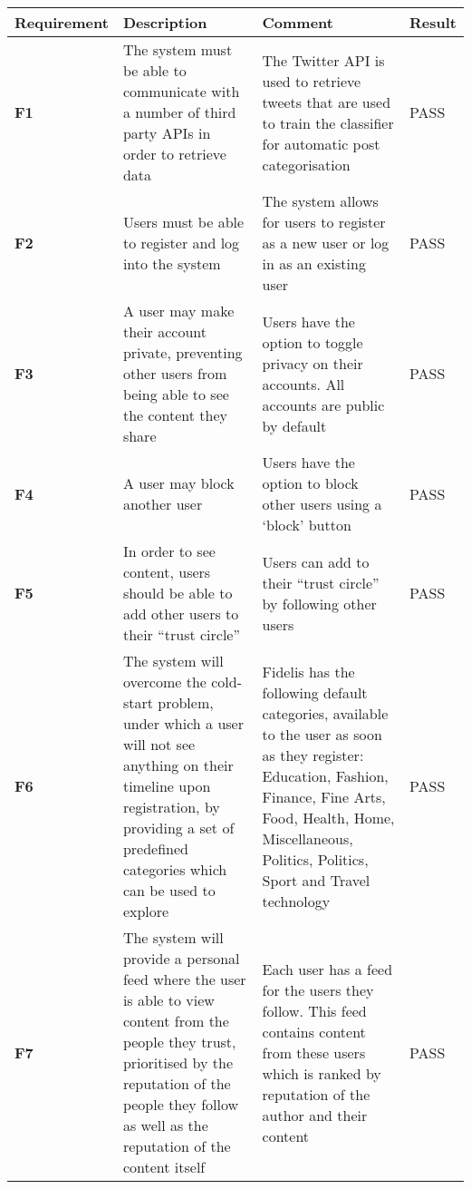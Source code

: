 \begin{longtabu} to \textwidth {XXXX}
\hline
Requirement & Description & Comment & Result \\ 
\hline
\textbf{F1} & The system must be able to communicate with a number of third party APIs in order to retrieve data & The Twitter API is used to retrieve tweets that are used to train the classifier for automatic post categorisation \vspace{2mm} & \textcolor{passgreen}{PASS} \\
\textbf{F2} & Users must be able to register and log into the system & The system allows for users to register as a new user or log in as an existing user \vspace{2mm} & \textcolor{passgreen}{PASS} \\
\textbf{F3} & A user may make their account private, preventing other users from being able to see the content they share & Users have the option to toggle privacy on their accounts. All accounts are public by default \vspace{2mm} & \textcolor{passgreen}{PASS} \\
\textbf{F4} & A user may block another user & Users have the option to block other users using a `block' button \vspace{2mm} & \textcolor{passgreen}{PASS} \\
\textbf{F5} & In order to see content, users should be able to add other users to their ``trust circle'' & Users can add to their ``trust circle'' by following other users \vspace{2mm} & \textcolor{passgreen}{PASS} \\
\textbf{F6} & The system will overcome the cold-start problem, under which a user will not see anything on their timeline upon registration, by providing a set of predefined categories which can be used to explore &                                                                                            Fidelis has the following default categories, available to the user as soon as they register: Education, Fashion, Finance, Fine Arts, Food, Health, Home, Miscellaneous, Politics, Politics, Sport and Travel technology & {\color[HTML]{34FF34} PASS}  \\
\textbf{F7} & The system will provide a personal feed where the user is able to view content from the people they trust, prioritised by the reputation of the people they follow as well as the reputation of the content itself &                                                                                              Each user has a feed for the users they follow. This feed contains content from these users which is ranked by reputation of the author and their content \vspace{2mm} & \textcolor{passgreen}{PASS} \\

\end{longtabu}
